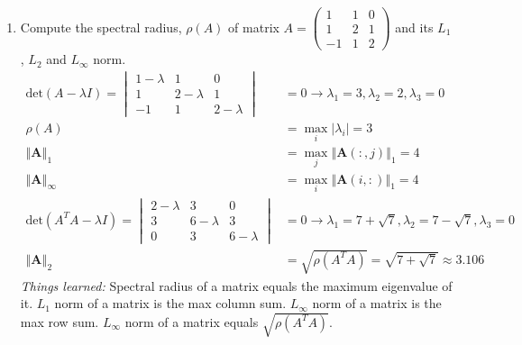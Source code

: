 \documentclass[10pt]{report}
\newcommand{\abs}[1] {\left| #1 \right|}
\newcommand{\norm}[2][\infty] {\left\Vert \mathbf{#2} \right\Vert_#1}
\begin{document}
\begin{enumerate}
	\item 
	Compute the spectral radius, $\rho(A)$ of matrix $A = \begin{pmatrix}
	1 & 1 & 0\\
	1 & 2 & 1\\
	-1 & 1 & 2
	\end{pmatrix}$ and its $L_1$, $L_2$ and $L_\infty$ norm.
	\begin{align*}
	\text{det}(A-\lambda I) = 
	\begin{vmatrix}
	1-\lambda & 1 & 0\\
	1 & 2-\lambda & 1\\
	-1 & 1 & 2-\lambda
	\end{vmatrix} &= 0 \to \lambda_1 = 3, \lambda_2 = 2, \lambda_3 = 0 \\
	\rho(A) &= \max_i{\abs{\lambda_i}} = 3\\
	\norm[1]{A} &= \max_{j}{\norm[1]{A(:,\mathit{j})}} = 4\\
	\norm{A} &= \max_{i}{\norm[1]{A(\mathit{i},:)}} = 4\\
	\text{det}(A^TA-\lambda I) = 
	\begin{vmatrix}
	2-\lambda & 3 & 0\\
	3 & 6-\lambda & 3\\
	0 & 3 & 6-\lambda
	\end{vmatrix} &= 0
	\to
	\lambda_1 = 7+\sqrt{7}, \lambda_2 = 7-\sqrt{7}, \lambda_3 = 0 \\
	\norm[2]{A} &= \sqrt{\rho(A^TA)} = \sqrt{7+\sqrt{7}} \approx 3.106
	\end{align*}
	\textit{Things learned:} Spectral radius of a matrix equals the maximum eigenvalue of it. $L_1$ norm of a matrix is the max column sum. $L_\infty$ norm of a matrix is the max row sum. $L_\infty$ norm of a matrix equals $\sqrt{\rho(A^TA)}$.
\end{enumerate}
\end{document}
